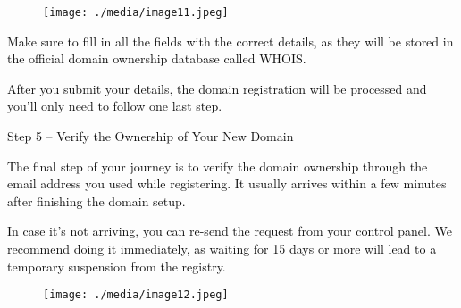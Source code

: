 \documentclass[12pt]{report}
\renewcommand{\_}{\kern-1.5pt\textunderscore\kern-1.5pt}
\begin{document}
\begin{itemize}

\par


\vspace{\baselineskip}


\begin{figure}[H]
\advance\leftskip 2.29in		\texttt{[image: ./media/image11.jpeg]}
\end{figure}



\textcolor[HTML]{0D0D0D}{Make sure to fill in all the fields with the correct details, as they will be stored in the oﬃcial domain ownership database called WHOIS.}\par


\vspace{\baselineskip} \tabto{0.59in} \textcolor[HTML]{0D0D0D}{After you submit your details, the domain registration will be processed and you’ll only need to follow one last step.}\par


\vspace{\baselineskip} \tabto{0.59in} \textcolor[HTML]{0D0D0D}{Step 5 – Verify the Ownership of Your New Domain}\par


\vspace{\baselineskip} \tabto{0.59in} \textcolor[HTML]{0D0D0D}{The final step of your journey is to verify the domain ownership through the email address you used while registering. It usually arrives within a few minutes after finishing the domain setup.}\par

 \tabto{0.59in} \textcolor[HTML]{0D0D0D}{In case it’s not arriving, you can re-send the request from your control panel. We recommend doing it immediately, as waiting for 15 days or more will lead to a temporary suspension from the registry.}\par




\begin{figure}[H]
	\begin{Center}
		\texttt{[image: ./media/image12.jpeg]}
	\end{Center}
\end{figure}



\end{itemize}
\end{document}
